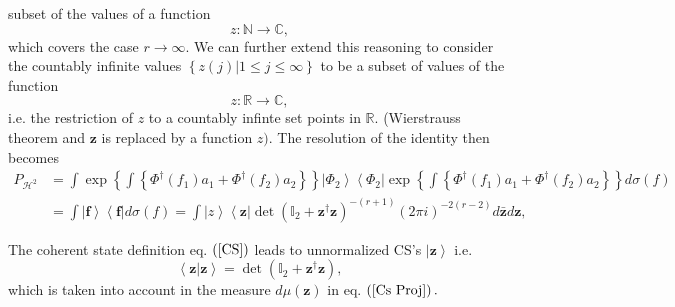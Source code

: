 \documentclass[aps,preprint]{revtex4}%
\begin{document}
subset of the values of a function
\begin{equation}
z:\mathbb{N}\rightarrow\mathbb{C},
\end{equation}
which covers the case $r\rightarrow\infty.$ We can further extend this
reasoning to consider the countably infinite values $\left\{  \left.  z\left(
j\right)  \right\vert 1\leq j\leq\infty\right\}  $ to be a subset of values of
the function
\begin{equation}
z:\mathbb{R\rightarrow C},
\end{equation}
i.e. the restriction of $z$ to a countably infinte set points in $\mathbb{R}.$
(Wierstrauss theorem and $\mathbf{z}$ is replaced by a function $z)$. The
resolution of the identity then becomes
\begin{align}
P_{\mathcal{H}^{2}}  &  =\int\exp\left\{  \int\left\{  \Phi^{\dagger}\left(
f_{1}\right)  a_{1}+\Phi^{\dagger}\left(  f_{2}\right)  a_{2}\right\}
\right\}  \left\vert \Phi_{2}\right\rangle \left\langle \Phi_{2}\right\vert
\exp\left\{  \int\left\{  \Phi^{\dagger}\left(  f_{1}\right)  a_{1}%
+\Phi^{\dagger}\left(  f_{2}\right)  a_{2}\right\}  \right\}  d\sigma\left(
f\right) \nonumber\\
&  =\int\left\vert \mathbf{f}\right\rangle \left\langle \mathbf{f}\right\vert
d\sigma\left(  f\right)  =\int\left\vert z\right\rangle \left\langle
\mathbf{z}\right\vert \det\left(  \mathbb{I}_{2}+\mathbf{z}^{\dagger
}\mathbf{z}\right)  ^{-\left(  r+1\right)  }\left(  2\pi i\right)  ^{-2\left(
r-2\right)  }d\mathbf{\bar{z}}d\mathbf{z},
\end{align}


The coherent state definition eq. $\left(  \ref{CS}\right)  $ leads to
unnormalized CS's $\left\vert \mathbf{z}\right\rangle $ i.e.
\begin{equation}
\left\langle \mathbf{z\left\vert \mathbf{z}\right.  }\right\rangle
=\det\left(  \mathbb{I}_{2}+\mathbf{z}^{\dagger}\mathbf{z}\right)  ,
\end{equation}
which is taken into account in the measure $d\mu\left(  \mathbf{z}\right)  $
in eq. $\left(  \ref{Cs Proj}\right)  .$
\end{document}
